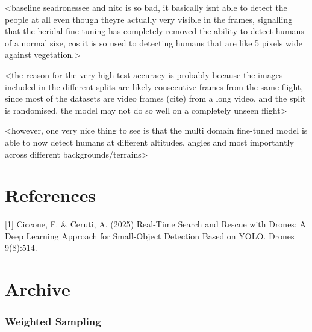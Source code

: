 \documentclass{article}
\begin{document}
<baseline seadronessee and nitc is so bad, it basically isnt able to detect the people at all even though theyre actually very visible in the frames, signalling that the heridal fine tuning has completely removed the ability to detect humans of a normal size, cos it is so used to detecting humans that are like 5 pixels wide against vegetation.>

<the reason for the very high test accuracy is probably because the images included in the different splits are likely consecutive frames from the same flight, since most of the datasets are video frames (cite) from a long video, and the split is randomised. the model may not do so well on a completely unseen flight>

<however, one very nice thing to see is that the multi domain fine-tuned model is able to now detect humans at different altitudes, angles and most importantly across different backgrounds/terrains>

\section*{References}

\small
[1] Ciccone, F. \& Ceruti, A. (2025) Real-Time Search and Rescue with Drones: A Deep Learning Approach for Small-Object Detection Based on YOLO. Drones 9(8):514.

\section{Archive}
\subsubsection{Weighted Sampling}
\end{document}
